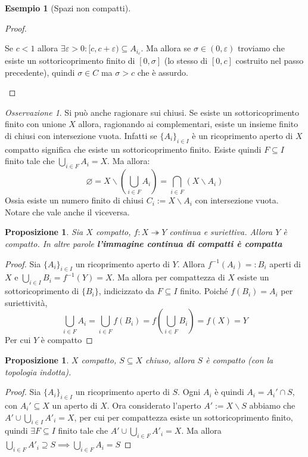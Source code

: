 \documentclass{article}
\newcounter{theo}[section]\setcounter{theo}{0}
\newcounter{excounter}[section]\setcounter{excounter}{0}
\theoremstyle{plain}
\newtheorem{proposition}[theo]{Proposizione}
\theoremstyle{definition}
\newtheorem{example}[excounter]{Esempio}
\theoremstyle{remark}
\newtheorem*{remark}{Osservazione}
\begin{document}
\begin{example}[Spazi non compatti]
\begin{proof}
\begin{enumerate}[label = \alph*.]
        Se \(c < 1\) allora \(\exists \varepsilon > 0: [c, c + \varepsilon)
        \subseteq A_{i_c} \). Ma allora se \(\sigma \in (0, \varepsilon)\)
        troviamo che esiste un sottoricoprimento finito di \([0, \sigma]\) (lo
        stesso di \([0, c]\) costruito nel passo precedente), quindi \(\sigma
        \in C\) ma \(\sigma > c\) che è assurdo.
\end{enumerate}
\end{proof}
\end{example}
\begin{remark}
    Si può anche ragionare sui chiusi. Se esiste un sottoricoprimento finito con
    unione \(X\) allora, ragionando ai complementari, esiste un insieme finito
    di chiusi con intersezione vuota.
    Infatti se \(\{{A_{i}}\}_{i \in  I}\) è un ricoprimento aperto di \(X\)
    compatto significa che esiste un sottoricoprimento finito. Esiste quindi \(F
    \subseteq I \) finito tale che \(\bigcup_{i \in  F} A_{i} = X\). Ma allora:
    \[
        \varnothing = X \smallsetminus \left(\bigcup_{i \in F}A_{i} \right) = \bigcap_{i
        \in F} \left(X \smallsetminus A_{i}\right)
    \]
    Ossia esiste un numero finito di chiusi \(C_{i} := X \smallsetminus A_{i}\)
    con intersezione vuota. Notare che vale anche il viceversa.
\end{remark}
\begin{proposition}
    Sia \(X\) compatto, \(f: X \twoheadrightarrow Y\) continua e suriettiva.
    Allora \(Y\) è compatto. In altre parole \textbf{l'immagine continua di
    compatti è compatta}
\end{proposition}
\begin{proof}
    Sia \(\{A_{i}\}_{i \in I}\) un ricoprimento aperto di \(Y\). Allora
    \(f^{-1}(A_{i}) =: B_{i}\) aperti di \(X\) e \(\bigcup_{i \in  I} B_{i} =
    f^{-1}(Y) = X\). Ma allora per compattezza di \(X\) esiste un
    sottoricoprimento di \(\{B_{i}\} \), indicizzato da \(F \subseteq I \)
    finito. Poiché \(f(B_{i}) = A_{i}\) per suriettività, 
    \[
        \bigcup_{i \in F} A_{i} = \bigcup_{i \in F} f\left( B_{i} \right) =
        f\left( \bigcup_{i \in F} B_{i} \right) = f\left( X \right) = Y 
    \]
    Per cui \(Y\) è compatto
\end{proof}
\begin{proposition}
    \(X\) compatto, \(S \subseteq X \) chiuso, allora \(S\) è compatto (con la
    topologia indotta).
\end{proposition}
\begin{proof}
    Sia \(\{A_{i}\}_{i \in I}\) un ricoprimento aperto di \(S\). Ogni \(A_{i}\)
    è quindi \(A_{i} = A_{i}' \cap S\), con \(A_{i}' \subseteq X \) un aperto di
    \(X\). Ora considerato l'aperto \(A' := X \smallsetminus S\) abbiamo che
    \(A' \cup \bigcup_{i \in  I} A'_i = X\), per cui per compattezza esiste un
    sottoricoprimento finito, quindi \(\exists F \subseteq I \) finito tale che
    \(A' \cup \bigcup_{i \in F} A'_i = X\). Ma allora \(\bigcup_{i \in F} A'_i
    \supseteq S \implies \bigcup_{i \in F} A_{i} = S \) 
\end{proof}
\end{document}
